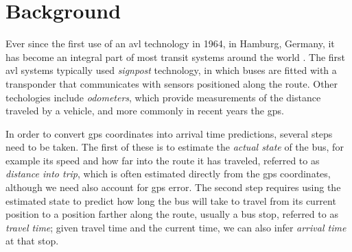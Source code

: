 \documentclass[12pt,a4paper]{article}
\begin{document}






\section{Background}
\label{sec:background}

Ever since the first use of an \gls{avl} technology in 1964, in Hamburg, Germany,
it has become an integral part of most transit systems around the world
\citep{tcrp:1997,tcrp:2003}.
The first \gls{avl} systems typically used \emph{signpost} technology,
in which buses are fitted with a transponder that communicates with
sensors positioned along the route.
Other techologies include \emph{odometers},
which provide measurements of the distance traveled by a vehicle,
and more commonly in recent years the \gls{gps}.


In order to convert \gls{gps} coordinates into arrival time predictions,
several steps need to be taken.
The first of these is to estimate the \emph{actual state} of the bus,
for example its speed and how far into the route it has traveled,
referred to as \emph{distance into trip},
which is often estimated directly from the \gls{gps} coordinates,
although we need also account for \gls{gps} error.
The second step requires using the estimated state
to predict how long the bus will take to travel from its current position
to a position farther along the route, usually a bus stop,
referred to as \emph{travel time};
given travel time and the current time, we can also infer \emph{arrival time} at that stop.
\end{document}
